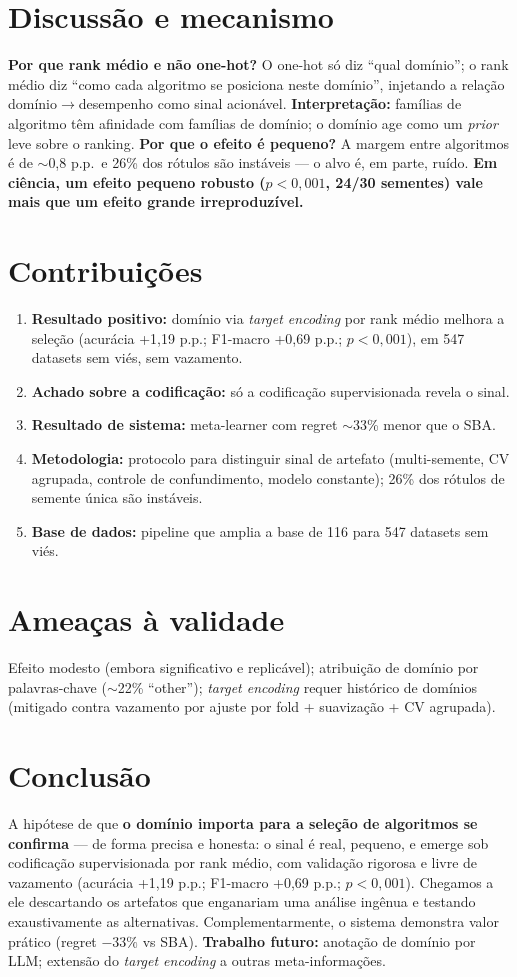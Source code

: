 \documentclass[11pt]{article}
\begin{document}
\section{Discussão e mecanismo}
\textbf{Por que rank médio e não one-hot?} O one-hot só diz ``qual domínio''; o
rank médio diz ``como cada algoritmo se posiciona neste domínio'', injetando a
relação domínio$\rightarrow$desempenho como sinal acionável. \textbf{Interpretação:}
famílias de algoritmo têm afinidade com famílias de domínio; o domínio age como um
\emph{prior} leve sobre o ranking. \textbf{Por que o efeito é pequeno?} A margem
entre algoritmos é de $\sim$0,8 p.p.\ e 26\% dos rótulos são instáveis --- o alvo é,
em parte, ruído. \textbf{Em ciência, um efeito pequeno robusto ($p<0,001$, 24/30
sementes) vale mais que um efeito grande irreproduzível.}

\section{Contribuições}
\begin{enumerate}[leftmargin=1.6em,itemsep=1pt]
  \item \textbf{Resultado positivo:} domínio via \emph{target encoding} por rank médio melhora a seleção (acurácia +1,19 p.p.; F1-macro +0,69 p.p.; $p<0,001$), em 547 datasets sem viés, sem vazamento.
  \item \textbf{Achado sobre a codificação:} só a codificação supervisionada revela o sinal.
  \item \textbf{Resultado de sistema:} meta-learner com regret $\sim$33\% menor que o SBA.
  \item \textbf{Metodologia:} protocolo para distinguir sinal de artefato (multi-semente, CV agrupada, controle de confundimento, modelo constante); 26\% dos rótulos de semente única são instáveis.
  \item \textbf{Base de dados:} pipeline que amplia a base de 116 para 547 datasets sem viés.
\end{enumerate}

\section{Ameaças à validade}
Efeito modesto (embora significativo e replicável); atribuição de domínio por
palavras-chave ($\sim$22\% ``other''); \emph{target encoding} requer histórico de
domínios (mitigado contra vazamento por ajuste por fold + suavização + CV agrupada).

\section{Conclusão}
A hipótese de que \textbf{o domínio importa para a seleção de algoritmos se
confirma} --- de forma precisa e honesta: o sinal é real, pequeno, e emerge sob
codificação supervisionada por rank médio, com validação rigorosa e livre de
vazamento (acurácia +1,19 p.p.; F1-macro +0,69 p.p.; $p<0,001$). Chegamos a ele
descartando os artefatos que enganariam uma análise ingênua e testando
exaustivamente as alternativas. Complementarmente, o sistema demonstra valor
prático (regret $-33\%$ vs SBA). \textbf{Trabalho futuro:} anotação de domínio por
LLM; extensão do \emph{target encoding} a outras meta-informações.
\end{document}
